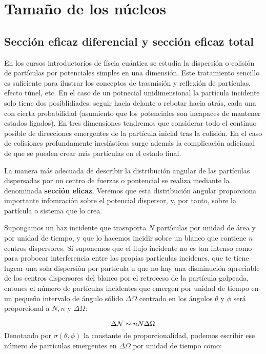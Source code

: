 \section{Tamaño de los núcleos}

\subsection{Sección eficaz diferencial y sección eficaz total}

En los cursos introductorios de físcia cuántica se estudia la dispersión o colisión de partículas por potenciales simples en una dimensión. Este tratamiento sencillo es suficiente para ilustrar los conceptos de trasmisión y reflexión de partículas, efecto túnel, etc. En el caso de un potnecial unidimensional la partícula incidente solo tiene dos posiblidiades: seguir hacia delante o rebotar hacia atrás, cada una con cierta probabilidad (asumiento que los potenciales son incapaces de mantener estados ligados). En tres dimensiones tendremos que considerar todo el continuo posible de direcciones emergentes de la partícula inicial tras la colisión. En el caso de colisiones profundamente ineslásticas surge además la complicación adicional de que se pueden crear más partículas en el estado final.

La manera más adecuada de describir la distribución angular de las partículas dispersadas por un centro de fuerzas o pontencial se realiza mediante la denominada \textbf{sección eficaz}. Veremos que esta distribución angular proporciona importante infomración sobre el potencial dispersor, y, por tanto, sobre la partícula o sistema que lo crea.

Supongamos un haz incidente que trasnporta $N$ partículas por unidad de área y por unidad de tiempo, y que lo hacemos incidir sobre un blanco que contiene $n$ centros dispersores. Si suponemos que el flujo incidente no es tan intenso como para probocar interferencia entre las propias partículas incidenes, que te tiene lugear una sola dispersión por partícula u que no hay una disminución apreciable de los centros dispersores del blanco por el retroceso de la partícula golpeada, entones el número de partículas incidentes que emergen por unidad de tiempo en un pequeño intervalo de ángulo sólido $\Delta \Omega$ centrado en los ángulos $\theta$ y $\phi$ será proporcional a $N,n$ y $\Delta \Omega$:

\begin{equation}
	\Delta \mathcal{N} \sim n N \Delta \Omega
\end{equation}
Denotando por $\sigma (\theta, \phi)$ la constante de proporcionalidad, podemos escribir ese número de partículas emergentes en $\Delta \Omega$ por unidad de tiempo como:

